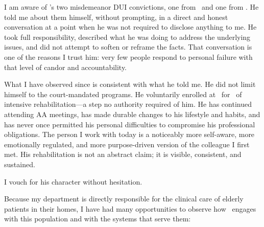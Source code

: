 I am aware of \ApplicantName's two misdemeanor DUI convictions, one from \IncidentOneDate\ and one from \IncidentTwoDate. He told me about them himself, without prompting, in a direct and honest conversation at a point when he was not required to disclose anything to me. He took full responsibility, described what he was doing to address the underlying issues, and did not attempt to soften or reframe the facts. That conversation is one of the reasons I trust him: very few people respond to personal failure with that level of candor and accountability.

What I have observed since is consistent with what he told me. He did not limit himself to the court-mandated programs. He voluntarily enrolled at \RehabProgram\ for \RehabDuration\ of intensive rehabilitation---a step no authority required of him. He has continued attending AA meetings, has made durable changes to his lifestyle and habits, and has never once permitted his personal difficulties to compromise his professional obligations. The person I work with today is a noticeably more self-aware, more emotionally regulated, and more purpose-driven version of the colleague I first met. His rehabilitation is not an abstract claim; it is visible, consistent, and sustained.

I vouch for his character without hesitation.


Because my department is directly responsible for the clinical care of elderly patients in their homes, I have had many opportunities to observe how \ApplicantName\ engages with this population and with the systems that serve them:

